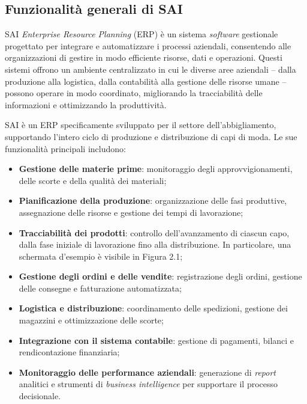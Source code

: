         \subsection{Funzionalità generali di SAI}
        SAI \textit{Enterprise Resource Planning} (ERP) è un sistema \textit{software} gestionale progettato per integrare e automatizzare i processi aziendali, consentendo alle organizzazioni di gestire in modo efficiente risorse, dati e operazioni. Questi sistemi offrono un ambiente centralizzato in cui le diverse aree aziendali – dalla produzione alla logistica, dalla contabilità alla gestione delle risorse umane – possono operare in modo coordinato, migliorando la tracciabilità delle informazioni e ottimizzando la produttività.  

        \vspace{0.2 em}
        \noindent SAI è un ERP specificamente sviluppato per il settore dell'abbigliamento, supportando l’intero ciclo di produzione e distribuzione di capi di moda. Le sue funzionalità principali includono:  
        \begin{itemize}
            \item \textbf{Gestione delle materie prime}: monitoraggio degli approvvigionamenti, delle scorte e della qualità dei materiali;
            \item \textbf{Pianificazione della produzione}: organizzazione delle fasi produttive, assegnazione delle risorse e gestione dei tempi di lavorazione;
            \item \textbf{Tracciabilità dei prodotti}: controllo dell’avanzamento di ciascun capo, dalla fase iniziale di lavorazione fino alla distribuzione. In particolare, una schermata d'esempio è visibile in Figura 2.1;
            \item \textbf{Gestione degli ordini e delle vendite}: registrazione degli ordini, gestione delle consegne e fatturazione automatizzata;
            \item \textbf{Logistica e distribuzione}: coordinamento delle spedizioni, gestione dei magazzini e ottimizzazione delle scorte;
            \item \textbf{Integrazione con il sistema contabile}: gestione di pagamenti, bilanci e rendicontazione finanziaria;
            \item \textbf{Monitoraggio delle performance aziendali}: generazione di \textit{report} analitici e strumenti di \textit{business intelligence} per supportare il processo decisionale.  
        \end{itemize}

